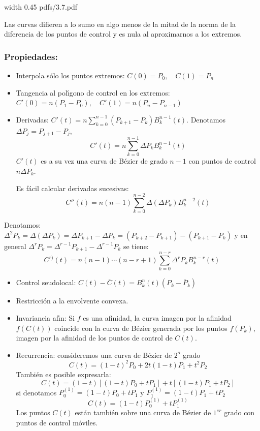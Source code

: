 \documentclass[twoside]{report}
\newcommand{\colocapdf}[2]{\quad\pdfimage width #2 {pdfs/#1.pdf}}
\begin{document}
\vspace{0.3cm}

\begin{center}
\colocapdf{3.7}{0.45\textwidth}
\end{center}

Las curvas difieren a lo sumo en algo menos de la mitad de la norma de la diferencia de los puntos de control y es nula al aproximarnos a los extremos.

\subsubsection{Propiedades:}

\begin{itemize}
\item Interpola s\'{o}lo los puntos extremos: $C(0)=P_0,\quad C(1)=P_n$
\item Tangencia al pol\'{\i}gono de control en los extremos: $C'(0)=n(P_1-P_0),\quad C'(1)=n(P_n-P_{n-1})$
\item Derivadas: $C'(t)=n\sum_{k=0}^{n-1}(P_{k+1}-P_k)B_k^{n-1}(t).$ Denotamos $\Delta P_j=P_{j+1}-P_j,$
$$C'(t)=n\sum_{k=0}^{n-1}\Delta P_kB_k^{n-1}(t)$$ $C'(t)$ es a su vez una curva de B\'{e}zier de grado $n-1$ con puntos de control $n\Delta P_k.$

Es f\'{a}cil calcular derivadas sucesivas:
$$C''(t)=n(n-1)\sum_{k=0}^{n-2} \Delta(\Delta P_k)B_k^{n-2}(t)$$
\end{itemize}

Denotamos: $\Delta^2 P_k=\Delta(\Delta P_k)=\Delta P_{k+1}-\Delta P_k=(P_{k+2}-P_{k+1})-(P_{k+1}-P_k)$ y en general $\Delta^r P_k=\Delta^{r-1} P_{k+1}-\Delta^{r-1} P_k$ se tiene:
$$C^{r)}(t)=n(n-1)\cdots(n-r+1)\sum_{k=0}^{n-r} \Delta^r P_k B_k^{n-r}(t)$$

\begin{itemize}
\item Control seudolocal: $C(t)-\overline{C}(t)=B_k^n(t) (P_k-\overline{P}_k)$
\item  Restricci\'{o}n a la envolvente convexa. %
\item Invariancia af\'{\i}n: Si $f$ es una afinidad, la curva imagen por la afinidad $f(C(t))$ coincide con la curva de B\'{e}zier generada por los puntos $f(P_k)$, imagen por la afinidad de los puntos de control de $C(t)$.
\item Recurrencia:  consideremos una curva de B\'{e}zier de $2^{o}$ grado
$$C(t)=(1-t)^2 P_0+2t(1-t) P_1+t^2P_2$$
Tambi\'{e}n es posible expresarla:
$$C(t)=(1-t)[(1-t)P_0+tP_1]+t[(1-t)P_1+tP_2]$$
si denotamos $P_0^{(1)}=(1-t)P_0+tP_1$ \;y\; $P_1^{(1)}=(1-t)P_1+tP_2$
$$C(t)=(1-t)P_0^{(1)}+tP_1^{(1)}$$
Los puntos $C(t)$ est\'{a}n tambi\'{e}n sobre una curva de B\'{e}zier de $1^{er}$ grado con puntos de control m\'{o}viles.
\end{itemize}
\end{document}
